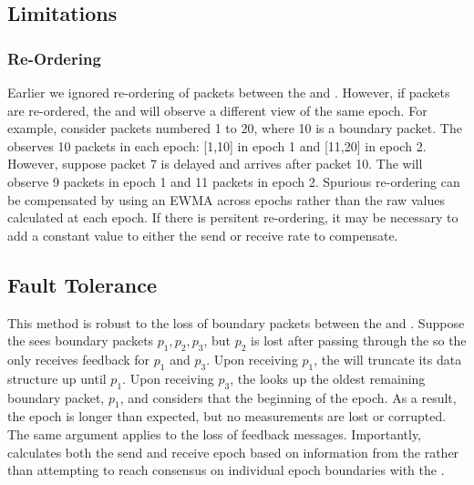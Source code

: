 \subsection{Limitations}
\subsubsection{Re-Ordering}
\label{s:measure:limitation:reorder}
Earlier we ignored re-ordering of packets between the \inbox and \outbox. However, if packets
are re-ordered, the \inbox and \outbox will observe a different view of the same epoch.
For example, consider packets numbered 1 to 20, where 10 is a boundary packet. The \inbox observes
10 packets in each epoch: [1,10] in epoch 1 and [11,20] in epoch 2. 
However, suppose packet 7 is delayed and arrives after packet 10. The \outbox will observe 9
packets in epoch 1 and 11 packets in epoch 2. 
Spurious re-ordering can be compensated by using an EWMA across epochs rather than the raw values
calculated at each epoch. If there is persitent re-ordering, it may be necessary to add a constant 
value to either the send or receive rate to compensate.

\subsection{Fault Tolerance}
\label{s:measure:loss}
 This method is robust to the loss of boundary packets between the \inbox and \outbox.
Suppose the \inbox sees boundary packets $p_1, p_2, p_3$, but $p_2$ is lost after passing through
the \inbox so the \inbox only receives feedback for $p_1$ and $p_3$. Upon receiving $p_1$, 
the \inbox will truncate its data structure up until $p_1$. Upon receiving $p_3$, the \inbox 
looks up the oldest remaining boundary packet, $p_1$, and considers that the beginning of the epoch.
As a result, the epoch is longer than expected, but no measurements are lost or corrupted. 
The same argument applies to the loss of feedback messages. 
Importantly, \inbox calculates both the send and receive epoch based on information
from the \outbox rather than attempting to reach consensus on individual epoch boundaries with the \outbox. 


